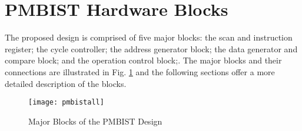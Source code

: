 \section{PMBIST Hardware Blocks}
\label{sect:bg-blocks}
The proposed design is comprised of five major blocks: the scan and instruction register; the cycle controller; the address generator block; the data generator and compare block; and the operation control block;.  The major blocks and their connections are illustrated in Fig. \ref{fig:pmbistall} and the following sections offer a more detailed description of the blocks.

\begin{figure}[H]
  \centering
  \texttt{[image: pmbistall]}
  \caption{Major Blocks of the PMBIST Design}
  \label{fig:pmbistall}
\end{figure}






